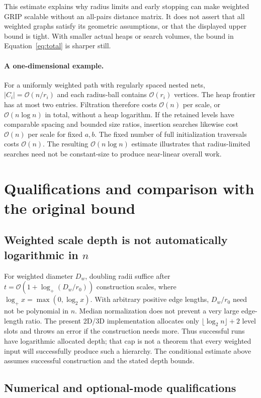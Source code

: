 \documentclass[11pt,a4paper]{article}
\newcommand{\bigO}{\mathcal O}
\begin{document}
This estimate explains why radius limits and early stopping can make weighted
GRIP scalable without an all-pairs distance matrix. It does not assert that
all weighted graphs satisfy its geometric assumptions, or that the displayed
upper bound is tight. With smaller actual heaps or search volumes, the bound
in Equation~\eqref{eq:total} is sharper still.

\paragraph{A one-dimensional example.}
For a uniformly weighted path with regularly spaced nested nets,
$|C_i|=\bigO(n/r_i)$ and each radius-ball contains $\bigO(r_i)$ vertices. The
heap frontier has at most two entries. Filtration therefore costs $\bigO(n)$
per scale, or $\bigO(n\log n)$ in total, without a heap logarithm. If the
retained levels have comparable spacing and bounded size ratios, insertion
searches likewise cost $\bigO(n)$ per scale for fixed $a,b$. The fixed number
of full initialization traversals costs $\bigO(n)$. The resulting
$\bigO(n\log n)$ estimate illustrates that radius-limited searches need not
be constant-size to produce near-linear overall work.

\clearpage
\section{Qualifications and comparison with the original bound}

\subsection{Weighted scale depth is not automatically logarithmic in \texorpdfstring{$n$}{n}}

For weighted diameter $D_w$, doubling radii suffice after
$t=\bigO(1+\log_+(D_w/r_0))$ construction scales, where
$\log_+x=\max(0,\log_2x)$. With arbitrary positive edge lengths, $D_w/r_0$
need not be polynomial in $n$. Median normalization does not prevent a very
large edge-length ratio. The present 2D/3D implementation allocates only
$\lfloor\log_2n\rfloor+2$ level slots and throws an error if the construction
needs more. Thus successful runs have logarithmic allocated depth; that cap is
not a theorem that every weighted input will successfully produce such a
hierarchy. The conditional estimate above assumes successful construction and
the stated depth bounds.

\subsection{Numerical and optional-mode qualifications}
\end{document}
